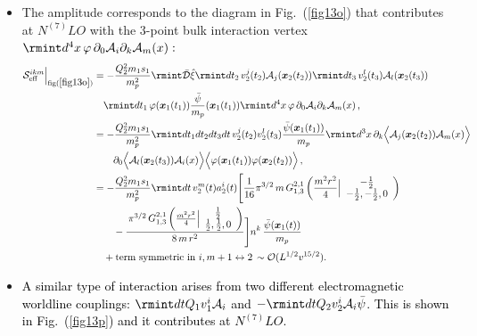 \begin{itemize}
\item The amplitude corresponds to the diagram in Fig.~(\ref{fig13o}) that contributes at $N^{(7)}LO$ with the  3-point bulk interaction vertex $\rmint d^4x\,\varphi\,\partial_{0}\mathcal{A}_{i}\partial_{k}\mathcal{A}_{m}(x) :$ 
\begin{align}
          \mathcal{S}_{\text{eff}}^{ikm}\Big |_{{\text{fig}(\ref{fig13o})}}
          &=-\frac{Q_2^2m_1s_1}{m_p^2}\rmint\Bar{\mathcal{D}}\Hat{\xi}\rmint dt_2\, v_2^{j}(t_2)\mathcal{A}_{j}(\boldsymbol{x}_2(t_2))\rmint dt_3 \,v_2^{l}(t_3)\mathcal{A}_{l}(\boldsymbol{x}_2(t_3))\notag\\
          &\quad \rmint dt_1\,\varphi(\boldsymbol{x}_1(t_1))\frac{\Bar{\psi}}{m_p}(\boldsymbol{x}_1(t_1))\rmint d^4x \,\varphi\,\partial_0 \mathcal{A}_{i}\partial_{k} \mathcal{A}_{m}(x)\,,\notag\\
        &=-\frac{Q_2^2m_1s_1}{m_p^2}\rmint dt_1dt_2dt_3dt\,v_2^{j}(t_2)v_2^{l}(t_3)\frac{\Bar{\psi}(\boldsymbol{x}_1(t_1))}{m_p}\rmint d^3 x\, \partial_{k}\Big\langle\mathcal{A}_{j}(\boldsymbol{x}_2(t_2))\mathcal{A}_{m}(x)\Big\rangle \notag\\
        &\qquad \partial_{0}\Big\langle \mathcal{A}_{l}(\boldsymbol{x}_2(t_3))\mathcal{A}_{i}(x)\Big\rangle \Big\langle \varphi(\boldsymbol{x}_1(t_1))\varphi(\boldsymbol{x}_2(t_2))\Big\rangle\,,\notag\\
    &=-\frac{Q_2^2m_1s_1}{m_p^2}\rmint dt\, v_2^{m}(t)a_2^{i}(t)\Bigg[\frac{1}{16} \pi^{3/2}\, m \,G_{1,3}^{2,1}\left(\frac{m^2 r^2}{4}\Big|
\begin{array}{c}
 -\frac{1}{2} \\
 -\frac{1}{2},-\frac{1}{2},0 \\
\end{array}
\right)\notag\\
&\qquad -\frac{\,\pi^{3/2}\, G_{1,3}^{2,1}\left(\frac{m^2 r^2}{4}\Big|
\begin{array}{c}
 \frac{1}{2} \\
 \frac{1}{2},\frac{1}{2},0 \\
\end{array}
\right)}{8 \,m\, r^2}\Bigg]n^k\,
\frac{\Bar{\psi}(\boldsymbol{x}_1(t))}{m_p}\notag\\
&\quad +\text{term symmetric in $i,m$}+1\leftrightarrow 2\,\sim \mathcal{O}(L^{1/2} v^{15/2}).
\end{align}
 \item \textcolor{black}{A similar type of interaction arises from two different electromagnetic worldline couplings: $\rmint dt Q_1v_1^{i}\mathcal{A}_{i}$ and $-\rmint dt Q_2v_2^{i}\mathcal{A}_{i}\Bar{\psi}$. This is shown in Fig.~(\ref{fig13p}) and it contributes at $N^{(7)}LO.$
}
\end{itemize}
